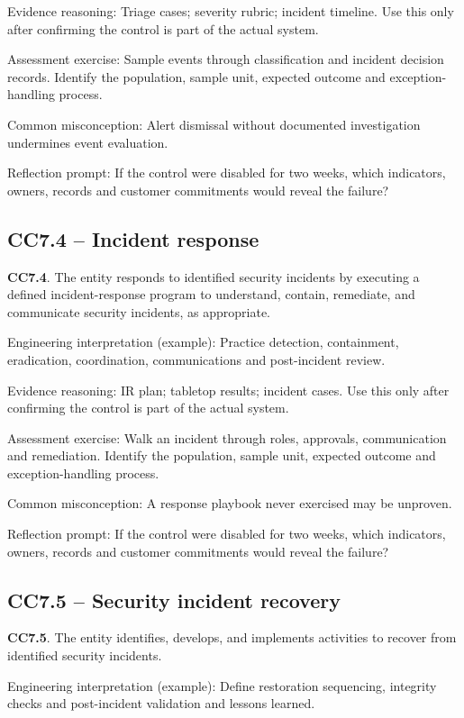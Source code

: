 \documentclass[10pt,oneside]{report}
\begin{document}
Evidence reasoning: Triage cases; severity rubric; incident timeline. Use this only after confirming the control is part of the actual system.

Assessment exercise: Sample events through classification and incident decision records. Identify the population, sample unit, expected outcome and exception-handling process.

Common misconception: Alert dismissal without documented investigation undermines event evaluation.

Reflection prompt: If the control were disabled for two weeks, which indicators, owners, records and customer commitments would reveal the failure?

\subsection{CC7.4 -- Incident response}
\begin{aicpabox}
\textbf{CC7.4}. The entity responds to identified security incidents by executing a defined incident-response program to understand, contain, remediate, and communicate security incidents, as appropriate.\par{}
\end{aicpabox}
Engineering interpretation (example): Practice detection, containment, eradication, coordination, communications and post-incident review.

Evidence reasoning: IR plan; tabletop results; incident cases. Use this only after confirming the control is part of the actual system.

Assessment exercise: Walk an incident through roles, approvals, communication and remediation. Identify the population, sample unit, expected outcome and exception-handling process.

Common misconception: A response playbook never exercised may be unproven.

Reflection prompt: If the control were disabled for two weeks, which indicators, owners, records and customer commitments would reveal the failure?

\subsection{CC7.5 -- Security incident recovery}
\begin{aicpabox}
\textbf{CC7.5}. The entity identifies, develops, and implements activities to recover from identified security incidents.\par{}
\end{aicpabox}
Engineering interpretation (example): Define restoration sequencing, integrity checks and post-incident validation and lessons learned.
\end{document}
